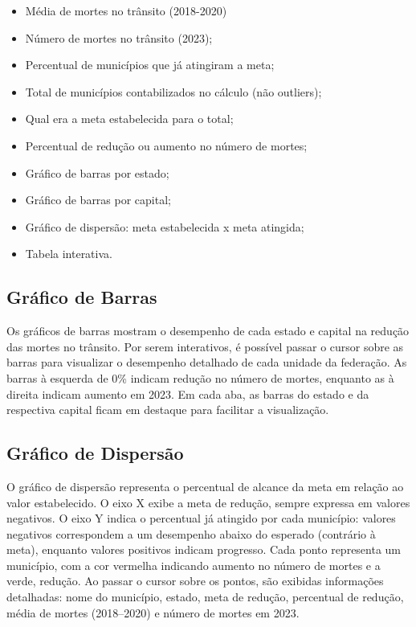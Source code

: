 \documentclass[
  letterpaper,
  DIV=11,
  numbers=noendperiod]{scrreprt}
\begin{document}
\begin{itemize}
\item
  Média de mortes no trânsito (2018-2020)
\item
  Número de mortes no trânsito (2023);
\item
  Percentual de municípios que já atingiram a meta;
\item
  Total de municípios contabilizados no cálculo (não outliers);
\item
  Qual era a meta estabelecida para o total;
\item
  Percentual de redução ou aumento no número de mortes;
\item
  Gráfico de barras por estado;
\item
  Gráfico de barras por capital;
\item
  Gráfico de dispersão: meta estabelecida x meta atingida;
\item
  Tabela interativa.
\end{itemize}

\subsection{Gráfico de Barras}\label{gruxe1fico-de-barras}

Os gráficos de barras mostram o desempenho de cada estado e capital na
redução das mortes no trânsito. Por serem interativos, é possível passar
o cursor sobre as barras para visualizar o desempenho detalhado de cada
unidade da federação. As barras à esquerda de 0\% indicam redução no
número de mortes, enquanto as à direita indicam aumento em 2023. Em cada
aba, as barras do estado e da respectiva capital ficam em destaque para
facilitar a visualização.

\subsection{Gráfico de Dispersão}\label{gruxe1fico-de-dispersuxe3o}

O gráfico de dispersão representa o percentual de alcance da meta em
relação ao valor estabelecido. O eixo X exibe a meta de redução, sempre
expressa em valores negativos. O eixo Y indica o percentual já atingido
por cada município: valores negativos correspondem a um desempenho
abaixo do esperado (contrário à meta), enquanto valores positivos
indicam progresso. Cada ponto representa um município, com a cor
vermelha indicando aumento no número de mortes e a verde, redução. Ao
passar o cursor sobre os pontos, são exibidas informações detalhadas:
nome do município, estado, meta de redução, percentual de redução, média
de mortes (2018--2020) e número de mortes em 2023.
\end{document}
